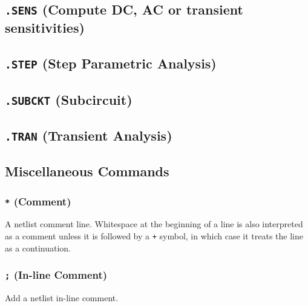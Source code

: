 \newpage
\subsection{\texttt{.SENS} (Compute DC, AC or transient sensitivities)}
\label{SensitivityAnalysis}


\newpage
\subsection{\texttt{.STEP} (Step Parametric Analysis)}\label{.STEP}


\newpage
\subsection{\texttt{.SUBCKT} (Subcircuit)}
\label{SubcircuitDefinition}


\newpage
\subsection{\texttt{.TRAN} (Transient Analysis)}


\newpage
\subsection{Miscellaneous Commands}
\subsubsection{\texttt{*} (Comment)}
 A netlist comment line.  Whitespace at
the beginning of a line is also interpreted as a comment unless it
is followed by a \verb|+| symbol, in which case it treats the line as a continuation.

\subsubsection{\texttt{;} (In-line Comment)}
 Add a netlist in-line comment.

